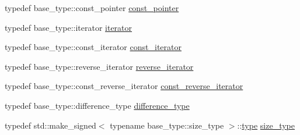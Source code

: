 \begin{DoxyCompactItemize}
typedef base\+\_\+type\+::const\+\_\+pointer \hyperlink{classIceBRG_1_1limit__vector_a06b68c790b5e5692b6e302d5478be33f}{const\+\_\+pointer}
\item 
typedef base\+\_\+type\+::iterator \hyperlink{classIceBRG_1_1limit__vector_aea9e186f4c5fb359da52895bafba6335}{iterator}
\item 
typedef base\+\_\+type\+::const\+\_\+iterator \hyperlink{classIceBRG_1_1limit__vector_ae7acd983de8fc074624eb50450a01e30}{const\+\_\+iterator}
\item 
typedef base\+\_\+type\+::reverse\+\_\+iterator \hyperlink{classIceBRG_1_1limit__vector_af4ba6b26317b4b6f8b0a5dc2e5a1d268}{reverse\+\_\+iterator}
\item 
typedef base\+\_\+type\+::const\+\_\+reverse\+\_\+iterator \hyperlink{classIceBRG_1_1limit__vector_a4feb81d3ff27e274df451f2fe85cd21a}{const\+\_\+reverse\+\_\+iterator}
\item 
typedef base\+\_\+type\+::difference\+\_\+type \hyperlink{classIceBRG_1_1limit__vector_ab5e21e09f06ae1a5327e9d47f31ef6b4}{difference\+\_\+type}
\item 
typedef std\+::make\+\_\+signed$<$ typename base\+\_\+type\+::size\+\_\+type $>$\+::\hyperlink{classIceBRG_1_1limit__vector_a67ad5ccda3b716a3aca2fa6223e75681}{type} \hyperlink{classIceBRG_1_1limit__vector_a81be3eb6cd519b3f5279ef735ccc4c2f}{size\+\_\+type}
\end{DoxyCompactItemize}
